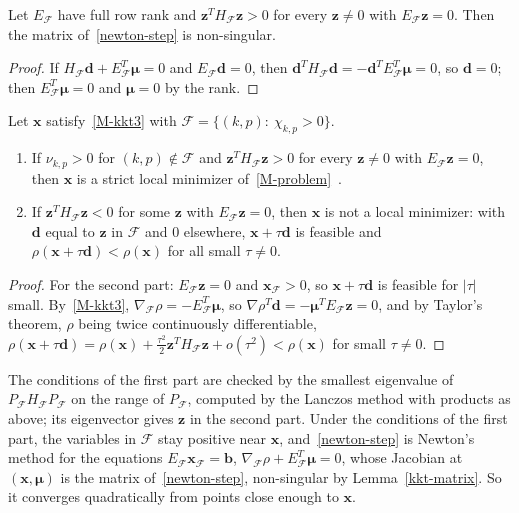 \begin{lemma}\label{kkt-matrix}
Let $E_{\mathcal F}$ have full row rank and $\bm z^TH_{\mathcal F}\bm z>0$ for every
$\bm z\ne 0$ with $E_{\mathcal F}\bm z=0$. Then the matrix of~\eqref{newton-step}
is non-singular.
\end{lemma}
\begin{proof}
If $H_{\mathcal F}\bm d+E_{\mathcal F}^T\bm\mu=0$ and $E_{\mathcal F}\bm d=0$, then
$\bm d^TH_{\mathcal F}\bm d=-\bm d^TE_{\mathcal F}^T\bm\mu=0$, so $\bm d=0$; then
$E_{\mathcal F}^T\bm\mu=0$ and $\bm\mu=0$ by the rank.
\end{proof}

\begin{proposition}\label{second-order}
Let $\bm x$ satisfy~\eqref{M-kkt3} with $\mathcal F=\{(k,p):\ \chi_{k,p}>0\}$.
\begin{enumerate}
\item If $\nu_{k,p}>0$ for $(k,p)\notin\mathcal F$ and $\bm z^TH_{\mathcal F}\bm z>0$ for
every $\bm z\ne 0$ with $E_{\mathcal F}\bm z=0$, then $\bm x$ is a strict local
minimizer of~\eqref{M-problem}~\cite{1968Fiacco_McCormick}.
\item If $\bm z^TH_{\mathcal F}\bm z<0$ for some $\bm z$ with $E_{\mathcal F}\bm z=0$, then
$\bm x$ is not a local minimizer: with $\bm d$ equal to $\bm z$ in
$\mathcal F$ and $0$ elsewhere, $\bm x+\tau\bm d$ is feasible and
$\rho(\bm x+\tau\bm d)<\rho(\bm x)$ for all small $\tau\ne 0$.
\end{enumerate}
\end{proposition}
\begin{proof}
For the second part: $E_{\mathcal F}\bm z=0$ and $\bm x_{\mathcal F}>0$, so
$\bm x+\tau\bm d$ is feasible for $|\tau|$ small. By~\eqref{M-kkt3},
$\nabla_{\mathcal F}\rho=-E_{\mathcal F}^T\bm\mu$, so
$\nabla\rho^T\bm d=-\bm\mu^TE_{\mathcal F}\bm z=0$, and by Taylor's theorem,
$\rho$ being twice continuously differentiable,
$\rho(\bm x+\tau\bm d)=\rho(\bm x)+\frac{\tau^2}{2}\bm z^TH_{\mathcal F}\bm z+o(\tau^2)<\rho(\bm x)$
for small $\tau\ne 0$.
\end{proof}

The conditions of the first part are checked by the smallest eigenvalue of
$P_{\mathcal F}H_{\mathcal F}P_{\mathcal F}$ on the range of $P_{\mathcal F}$,
computed by the Lanczos method with products as above; its eigenvector gives
$\bm z$ in the second part. Under the conditions of the first part, the
variables in $\mathcal F$ stay positive near $\bm x$, and~\eqref{newton-step}
is Newton's method for the equations $E_{\mathcal F}\bm x_{\mathcal F}=\bm b$,
$\nabla_{\mathcal F}\rho+E_{\mathcal F}^T\bm\mu=0$, whose Jacobian at
$(\bm x,\bm\mu)$ is the matrix of~\eqref{newton-step}, non-singular by
Lemma~\ref{kkt-matrix}. So it converges quadratically from points close
enough to $\bm x$.

